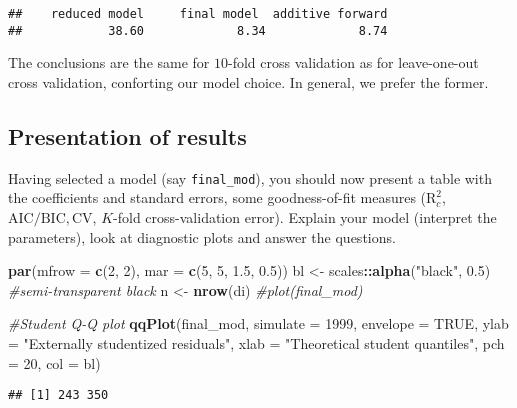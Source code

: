 \documentclass[]{book}
\newenvironment{Shaded}{\begin{snugshade}}{\end{snugshade}}
\newcommand{\CommentTok}[1]{\textcolor[rgb]{0.56,0.35,0.01}{\textit{#1}}}
\newcommand{\DataTypeTok}[1]{\textcolor[rgb]{0.13,0.29,0.53}{#1}}
\newcommand{\DecValTok}[1]{\textcolor[rgb]{0.00,0.00,0.81}{#1}}
\newcommand{\FloatTok}[1]{\textcolor[rgb]{0.00,0.00,0.81}{#1}}
\newcommand{\KeywordTok}[1]{\textcolor[rgb]{0.13,0.29,0.53}{\textbf{#1}}}
\newcommand{\NormalTok}[1]{#1}
\newcommand{\OperatorTok}[1]{\textcolor[rgb]{0.81,0.36,0.00}{\textbf{#1}}}
\newcommand{\OtherTok}[1]{\textcolor[rgb]{0.56,0.35,0.01}{#1}}
\newcommand{\StringTok}[1]{\textcolor[rgb]{0.31,0.60,0.02}{#1}}
\theoremstyle{definition}
\theoremstyle{definition}
\theoremstyle{definition}
\theoremstyle{remark}
\begin{document}
\begin{verbatim}
##    reduced model     final model  additive forward 
##            38.60             8.34             8.74
\end{verbatim}

The conclusions are the same for \(10\)-fold cross validation as for
leave-one-out cross validation, conforting our model choice. In general,
we prefer the former.

\hypertarget{presentation-of-results}{%
\subsection{Presentation of results}\label{presentation-of-results}}

Having selected a model (say \texttt{final\_mod}), you should now
present a table with the coefficients and standard errors, some
goodness-of-fit measures (\(\mathrm{R}^2_c\),
\(\mathrm{AIC}/\mathrm{BIC}, \mathrm{CV}\), \(K\)-fold cross-validation
error). Explain your model (interpret the parameters), look at
diagnostic plots and answer the questions.

\begin{Shaded}
\begin{Highlighting}[]
\KeywordTok{par}\NormalTok{(}\DataTypeTok{mfrow =} \KeywordTok{c}\NormalTok{(}\DecValTok{2}\NormalTok{, }\DecValTok{2}\NormalTok{), }\DataTypeTok{mar =} \KeywordTok{c}\NormalTok{(}\DecValTok{5}\NormalTok{, }\DecValTok{5}\NormalTok{, }\FloatTok{1.5}\NormalTok{, }\FloatTok{0.5}\NormalTok{))}
\NormalTok{bl <-}\StringTok{ }\NormalTok{scales}\OperatorTok{::}\KeywordTok{alpha}\NormalTok{(}\StringTok{"black"}\NormalTok{, }\FloatTok{0.5}\NormalTok{) }\CommentTok{#semi-transparent black}
\NormalTok{n <-}\StringTok{ }\KeywordTok{nrow}\NormalTok{(di)}
\CommentTok{#plot(final_mod)}

\CommentTok{#Student Q-Q plot}
\KeywordTok{qqPlot}\NormalTok{(final_mod, }\DataTypeTok{simulate =} \DecValTok{1999}\NormalTok{, }\DataTypeTok{envelope =} \OtherTok{TRUE}\NormalTok{,}
       \DataTypeTok{ylab =} \StringTok{"Externally studentized residuals"}\NormalTok{, }
       \DataTypeTok{xlab =} \StringTok{"Theoretical student quantiles"}\NormalTok{, }
       \DataTypeTok{pch =} \DecValTok{20}\NormalTok{, }\DataTypeTok{col =}\NormalTok{ bl)}
\end{Highlighting}
\end{Shaded}

\begin{verbatim}
## [1] 243 350
\end{verbatim}
\end{document}
